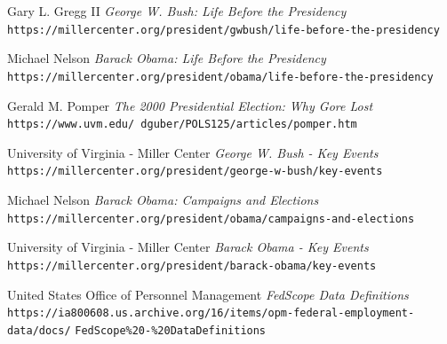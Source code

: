 \documentclass{article}
\begin{document}
\begin{thebibliography}{10}
    Gary L. Gregg II
    \textit{George W. Bush: Life Before the Presidency}
    \texttt{https://millercenter.org/president/gwbush/life-before-the-presidency}

    Michael Nelson
    \textit{Barack Obama: Life Before the Presidency}
    \texttt{https://millercenter.org/president/obama/life-before-the-presidency}

    Gerald M. Pomper
    \textit{The 2000 Presidential Election: Why Gore Lost}
    \texttt{https://www.uvm.edu/~dguber/POLS125/articles/pomper.htm}

    University of Virginia - Miller Center
    \textit{George W. Bush - Key Events}
    \texttt{https://millercenter.org/president/george-w-bush/key-events}

    Michael Nelson
    \textit{Barack Obama: Campaigns and Elections}
    \texttt{https://millercenter.org/president/obama/campaigns-and-elections}

    University of Virginia - Miller Center
    \textit{Barack Obama - Key Events}
    \texttt{https://millercenter.org/president/barack-obama/key-events}

    United States Office of Personnel Management
    \textit{FedScope Data Definitions}
    \texttt{https://ia800608.us.archive.org/16/items/opm-federal-employment-data/docs/}
    \texttt{FedScope\%20-\%20DataDefinitions}

\end{thebibliography}
\end{document}
